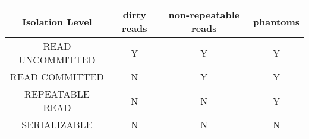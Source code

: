 \documentclass[landscape,8pt]{extarticle}
\begin{document}
\begin{multicols}{4}
\begin{center}
    \end{center}
    \begin{center}
        \begin{adjustbox}{angle=270}
            \begin{tabular}{| c | c | c | c |} \hline
                Isolation Level  & dirty reads & non-repeatable reads & phantoms \\ \hline
                READ UNCOMMITTED & Y           & Y                    & Y        \\ \hline
                READ COMMITTED   & N           & Y                    & Y        \\ \hline
                REPEATABLE READ  & N           & N                    & Y        \\ \hline
                SERIALIZABLE     & N           & N                    & N        \\ \hline
            \end{tabular}
        \end{adjustbox}
    \end{center}
\end{multicols}
\end{document}
